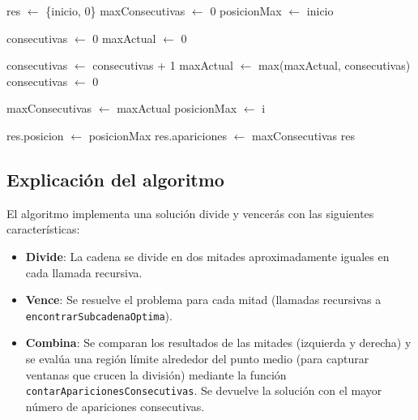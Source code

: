 \documentclass[12pt,a4paper]{article}
\begin{document}
\begin{algorithm}[H]
\caption{Contar Apariciones Consecutivas}
\begin{algorithmic}[1]
    \State res $\gets$ \{inicio, 0\} 
    \State maxConsecutivas $\gets$ 0 
    \State posicionMax $\gets$ inicio 
    
        \State consecutivas $\gets$ 0 
        \State maxActual $\gets$ 0 
        
                \State consecutivas $\gets$ consecutivas + 1 
                \State maxActual $\gets$ max(maxActual, consecutivas) 
            \Else
                \State consecutivas $\gets$ 0 
            \EndIf
        \EndFor
        
            \State maxConsecutivas $\gets$ maxActual 
            \State posicionMax $\gets$ i 
        \EndIf
    \EndFor
    
    \State res.posicion $\gets$ posicionMax 
    \State res.apariciones $\gets$ maxConsecutivas 
    \State \Return res 
\EndFunction
\end{algorithmic}
\end{algorithm}

\subsection{Explicación del algoritmo}
El algoritmo implementa una solución divide y vencerás con las siguientes características:
\begin{itemize}
    \item \textbf{Divide}: La cadena se divide en dos mitades aproximadamente iguales en cada llamada recursiva.
    \item \textbf{Vence}: Se resuelve el problema para cada mitad (llamadas recursivas a \texttt{encontrarSubcadenaOptima}).
    \item \textbf{Combina}: Se comparan los resultados de las mitades (izquierda y derecha) y se evalúa una región límite alrededor del punto medio (para capturar ventanas que crucen la división) mediante la función \texttt{contarAparicionesConsecutivas}. Se devuelve la solución con el mayor número de apariciones consecutivas.
\end{itemize}
\end{document}

